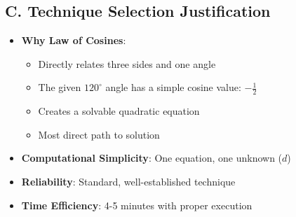 \documentclass[12pt]{article}
\begin{document}
\begin{techniquesbox}
\subsection*{C. Technique Selection Justification}
\begin{itemize}[leftmargin=*]
    \item \textbf{Why Law of Cosines}: 
    \begin{itemize}
        \item Directly relates three sides and one angle
        \item The given $120^\circ$ angle has a simple cosine value: $-\frac{1}{2}$
        \item Creates a solvable quadratic equation
        \item Most direct path to solution
    \end{itemize}
    \item \textbf{Computational Simplicity}: One equation, one unknown ($d$)
    \item \textbf{Reliability}: Standard, well-established technique
    \item \textbf{Time Efficiency}: 4-5 minutes with proper execution
\end{itemize}
\end{techniquesbox}
\end{document}
